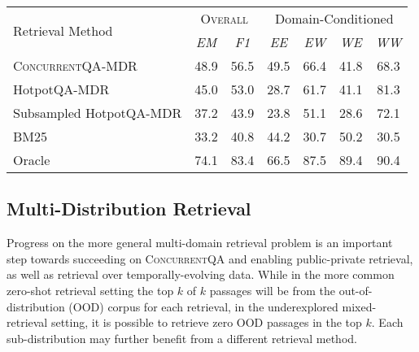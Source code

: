 \documentclass{article}
\renewcommand\cite{\citep}	\newcommand\shortcite{\citeyearpar}\newcommand\newcite{\citet}
\newcommand{\datasetname}{\textsc{ConcurrentQA}\xspace}
\begin{document}
\begin{table*}[t!]
        \begin{center}
    \normalsize
    \begin{tabular}{lcc|cccc}
    \toprule
       \multirow{2}{*}{Retrieval Method}  &      \multicolumn{2}{p{2.7cm}}{\centering \textsc{Overall}} &     \multicolumn{4}{p{4cm}}{\centering Domain-Conditioned}  \\
    & \emph{EM}  &   \emph{F1}    & \emph{EE} & \emph{EW} & \emph{WE} & \emph{WW} \\

    \midrule
    \datasetname-MDR    & 48.9 & 56.5 & 49.5 & 66.4 & 41.8 & 68.3 \\
    HotpotQA-MDR   & 45.0 & 53.0 & 28.7 & 61.7 & 41.1 & 81.3 \\
    Subsampled HotpotQA-MDR  & 37.2 & 43.9 & 23.8 & 51.1 & 28.6 & 72.1 \\
    BM25            & 33.2 & 40.8 & 44.2 & 30.7 & 50.2 & 30.5 \\
    \midrule
    Oracle & 74.1 & 83.4 & 66.5 & 87.5 & 89.4 & 90.4 \\
    \bottomrule
    \end{tabular}\normalsize
    \caption{\datasetname results using four retrieval approaches, and oracle retrieval. On the right, we show performance (F1 scores) by the domains of the $\mathrm{Hop_1}$ and $\mathrm{Hop_2}$ gold passages for each question, where email is ``E'' and Wikipedia is ``W''. ``EW'' indicates the $\mathrm{Hop_1}$ gold passage is an email, and $\mathrm{Hop_2}$ gold passage is from Wikipedia.}
    \vspace{-2mm}
    \label{tab:concurrent_baselines}
    \end{center}
\end{table*}


\subsection{Multi-Distribution Retrieval}
\label{sec:multiretrieve}
Progress on the more general multi-domain retrieval problem is an important step towards succeeding on \datasetname and enabling public-private retrieval, as well as retrieval over temporally-evolving data. While in the more common zero-shot retrieval setting \cite{guoa2021multireqa, thakur2021beir} the top $k$ of $k$ passages will be from the out-of-distribution (OOD) corpus for each retrieval, in the underexplored mixed-retrieval setting, it is possible to retrieve zero OOD passages in the top $k$. Each sub-distribution may further benefit from a different retrieval method. 
\end{document}
